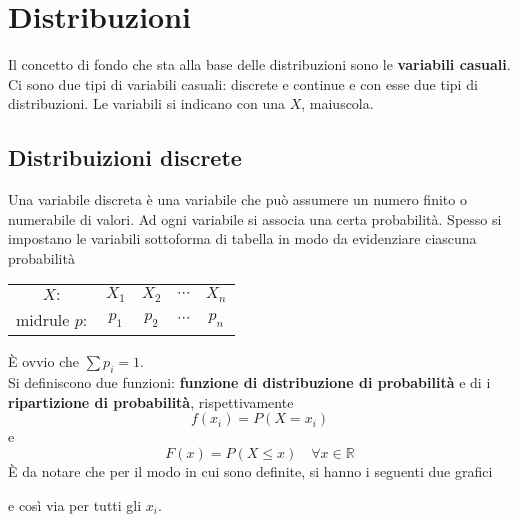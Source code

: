 
\section{Distribuzioni}
Il concetto di fondo che sta alla base delle distribuzioni sono le \textbf{variabili casuali}. Ci 
sono due tipi di variabili casuali: discrete e continue e con esse due tipi di distribuzioni. Le
variabili si indicano con una $X$, maiuscola.

\subsection{Distribuizioni discrete}
Una variabile discreta è una variabile che può assumere un numero finito o numerabile di valori. Ad
ogni variabile si associa una certa probabilità. Spesso si impostano le variabili sottoforma di 
tabella in modo da evidenziare ciascuna probabilità
\begin{center}
  \begin{tabular}{c c c c c}
    $X:$ & $X_1$ & $X_2$ & $\cdots$ & $X_n$\\midrule
    $p:$ & $p_1$ & $p_2$ & $\cdots$ & $p_n$
  \end{tabular}
\end{center}
È ovvio che $\sum p_i = 1$.\\ [\baselineskip]
Si definiscono due funzioni: \textbf{funzione di distribuzione di probabilità} e di i
\textbf{ripartizione di probabilità}, rispettivamente
\begin{equation*}
  f(x_i) = P(X=x_i)
\end{equation*}
e
\begin{equation*}
  F(x) = P(X\leq x)\quad\forall x\in\mathbb{R}
\end{equation*}
È da notare che per il modo in cui sono definite, si hanno i seguenti due grafici
\begin{center}
\end{center}
e così via per tutti gli $x_i$.
\begin{center}
\end{center}
